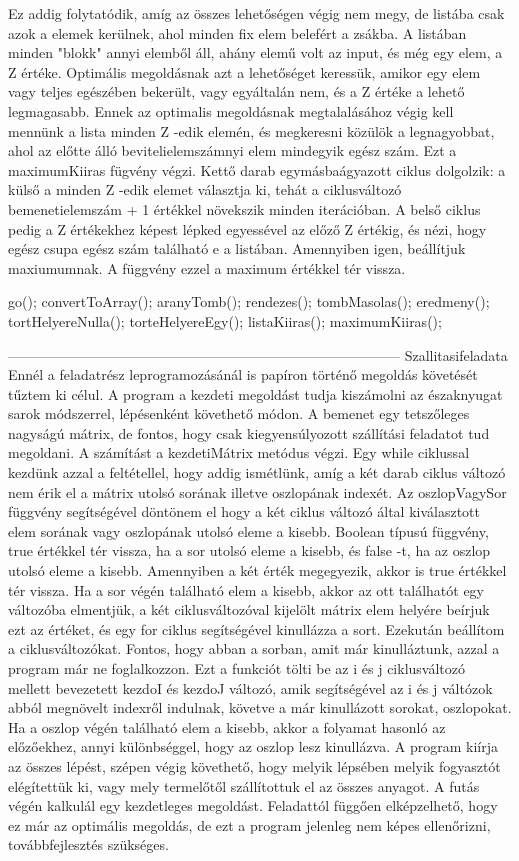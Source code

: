 Ez addig folytatódik, amíg az összes lehetőségen végig nem megy, de listába csak azok a elemek kerülnek, ahol minden fix elem belefért a zsákba. A listában minden "blokk" annyi elemből áll, ahány elemű volt az input, és még egy elem, a Z értéke. Optimális megoldásnak azt a lehetőséget keressük, amikor egy elem vagy teljes egészében bekerült, vagy egyáltalán nem, és a Z értéke a lehető legmagasabb. Ennek az optimalis megoldásnak megtalalásához végig kell mennünk a lista minden Z -edik elemén, és megkeresni közülök a legnagyobbat, ahol az előtte álló bevitelielemszámnyi elem mindegyik egész szám. Ezt a maximumKiiras fügvény végzi. Kettő darab egymásbaágyazott ciklus dolgolzik: a külső a minden Z -edik elemet választja ki, tehát a ciklusváltozó bemenetielemszám + 1 értékkel növekszik minden iterációban. A belső ciklus pedig a Z értékekhez képest lépked egyessével az előző Z értékig, és nézi, hogy egész csupa egész szám található e a listában. Amennyiben igen, beállítjuk maxiumumnak. A függvény ezzel a maximum értékkel tér vissza.

go();
convertToArray();
aranyTomb();
rendezes();
tombMasolas();
eredmeny();
tortHelyereNulla();
torteHelyereEgy();
listaKiiras();
maximumKiiras();



------------------------------------------------------------------------------------
Szallitasifeladata
Ennél a feladatrész leprogramozásánál is papíron történő megoldás követését tűztem ki célul. A program a kezdeti megoldást tudja kiszámolni az északnyugat sarok módszerrel, lépésenként követhető módon. A bemenet egy tetszőleges nagyságú mátrix, de fontos, hogy csak kiegyensúlyozott szállítási feladatot tud megoldani.
A számítást a kezdetiMátrix metódus végzi. Egy while ciklussal kezdünk azzal a feltétellel, hogy addig ismétlünk, amíg a két darab ciklus változó nem érik el a mátrix utolsó sorának illetve oszlopának indexét.
Az oszlopVagySor függvény segítségével döntönem el hogy a két ciklus változó által kiválasztott elem sorának vagy oszlopának utolsó eleme a kisebb. Boolean típusú függvény, true értékkel tér vissza, ha a sor utolsó eleme a kisebb, és false -t, ha az oszlop utolsó eleme a kisebb. Amennyiben a két érték megegyezik, akkor is true értékkel tér vissza.
Ha a sor végén található elem a kisebb, akkor az ott találhatót egy változóba elmentjük, a két ciklusváltozóval kijelölt mátrix elem helyére beírjuk ezt az értéket, és egy for ciklus segítségével kinullázza a sort. Ezekután beállítom a ciklusváltozókat. Fontos, hogy abban a sorban, amit már kinulláztunk, azzal a program már ne foglalkozzon. Ezt a funkciót tölti be az i és j ciklusváltozó mellett bevezetett kezdoI és kezdoJ változó, amik segítségével az i és j váltózok abból megnövelt indexről indulnak, követve a már kinullázott sorokat, oszlopokat.
Ha a oszlop végén található elem a kisebb, akkor a folyamat hasonló az előzőekhez, annyi különbséggel, hogy az oszlop lesz kinullázva.
A program kiírja az összes lépést, szépen végig követhető, hogy melyik lépsében melyik fogyasztót elégítettük ki, vagy mely termelőtől szállítottuk el az összes anyagot.
A futás végén kalkulál egy kezdetleges megoldást. Feladattól függően elképzelhető, hogy ez már az optimális megoldás, de ezt a program jelenleg nem képes ellenőrizni, továbbfejlesztés szükséges.

